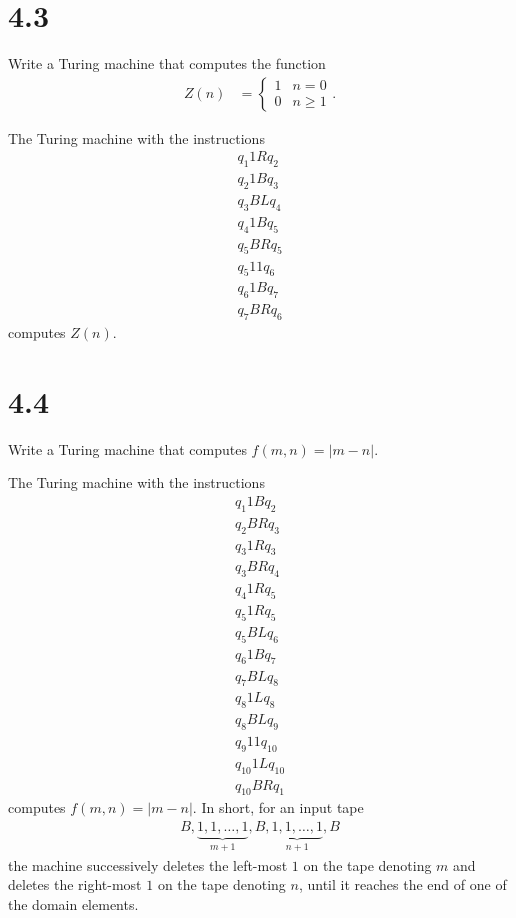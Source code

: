 \documentclass[12pt]{mypackage}
\begin{document}
\section{4.3}%
\begin{problem}
  Write a Turing machine that computes the function
  \begin{align*}
    Z(n) &= \begin{cases}
      1 & n = 0\\
      0 & n \geq 1
    \end{cases}.
  \end{align*}
\end{problem}
\begin{solution}
  The Turing machine with the instructions
  \begin{align*}
    q_1 1 R q_2\\
    q_2 1 B q_3\\
    q_3 B L q_4\\
    q_4 1 B q_5\\
    q_5 B R q_5\\
    q_5 1 1 q_6\\
    q_6 1 B q_7\\
    q_7 B R q_6
  \end{align*}
  computes $Z(n)$.
\end{solution}
\section{4.4}%
\begin{problem}
  Write a Turing machine that computes $f\left(m,n\right) = \left\vert m-n \right\vert$.
\end{problem}
\begin{solution}
  The Turing machine with the instructions
  \begin{align*}
    q_1 1 B q_2\\
    q_2 B R q_3\\
    q_3 1 R q_3\\
    q_3 B R q_4\\
    q_4 1 R q_5\\
    q_5 1 R q_5\\
    q_5 B L q_6\\
    q_6 1 B q_7\\
    q_7 B L q_8\\
    q_8 1 L q_8\\
    q_8 B L q_9\\
    q_9 1 1 q_{10}\\
    q_{10} 1 L q_{10} \\
    q_{10} B R q_1
  \end{align*}
  computes $f\left(m,n\right) = \left\vert m-n \right\vert$. In short, for an input tape
  \begin{align*}
    B,\underbrace{1,1,\dots,1}_{m+1},B,\underbrace{1,1,\dots,1}_{n+1},B
  \end{align*}
  the machine successively deletes the left-most $1$ on the tape denoting $m$ and deletes the right-most $1$ on the tape denoting $n$, until it reaches the end of one of the domain elements.
\end{solution}
\end{document}
